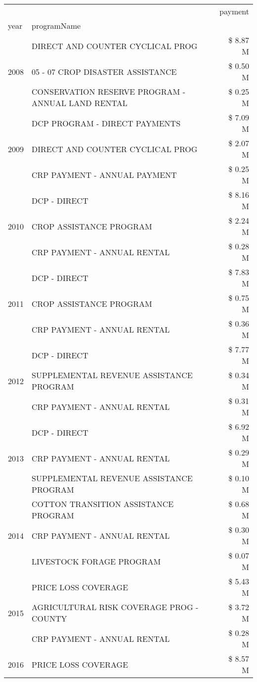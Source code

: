 \begin{tabular}{llr}
\toprule
 &  & payment \\
year & programName &  \\
\midrule
\multirow[t]{3}{*}{2008} & DIRECT AND COUNTER CYCLICAL PROG & \$ 8.87 M \\
 & 05 - 07 CROP DISASTER ASSISTANCE & \$ 0.50 M \\
 & CONSERVATION RESERVE PROGRAM - ANNUAL LAND RENTAL & \$ 0.25 M \\
\cline{1-3}
\multirow[t]{3}{*}{2009} & DCP PROGRAM - DIRECT PAYMENTS & \$ 7.09 M \\
 & DIRECT AND COUNTER CYCLICAL PROG & \$ 2.07 M \\
 & CRP PAYMENT - ANNUAL PAYMENT & \$ 0.25 M \\
\cline{1-3}
\multirow[t]{3}{*}{2010} & DCP - DIRECT & \$ 8.16 M \\
 & CROP ASSISTANCE PROGRAM & \$ 2.24 M \\
 & CRP PAYMENT - ANNUAL RENTAL & \$ 0.28 M \\
\cline{1-3}
\multirow[t]{3}{*}{2011} & DCP - DIRECT & \$ 7.83 M \\
 & CROP ASSISTANCE PROGRAM & \$ 0.75 M \\
 & CRP PAYMENT - ANNUAL RENTAL & \$ 0.36 M \\
\cline{1-3}
\multirow[t]{3}{*}{2012} & DCP - DIRECT & \$ 7.77 M \\
 & SUPPLEMENTAL REVENUE ASSISTANCE PROGRAM & \$ 0.34 M \\
 & CRP PAYMENT - ANNUAL RENTAL & \$ 0.31 M \\
\cline{1-3}
\multirow[t]{3}{*}{2013} & DCP - DIRECT & \$ 6.92 M \\
 & CRP PAYMENT - ANNUAL RENTAL & \$ 0.29 M \\
 & SUPPLEMENTAL REVENUE ASSISTANCE PROGRAM & \$ 0.10 M \\
\cline{1-3}
\multirow[t]{3}{*}{2014} & COTTON TRANSITION ASSISTANCE PROGRAM & \$ 0.68 M \\
 & CRP PAYMENT - ANNUAL RENTAL & \$ 0.30 M \\
 & LIVESTOCK FORAGE PROGRAM & \$ 0.07 M \\
\cline{1-3}
\multirow[t]{3}{*}{2015} & PRICE LOSS COVERAGE & \$ 5.43 M \\
 & AGRICULTURAL RISK COVERAGE PROG - COUNTY & \$ 3.72 M \\
 & CRP PAYMENT - ANNUAL RENTAL & \$ 0.28 M \\
\cline{1-3}
\multirow[t]{3}{*}{2016} & PRICE LOSS COVERAGE & \$ 8.57 M \\

\end{tabular}
